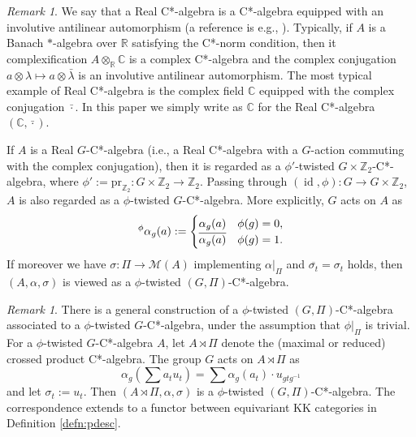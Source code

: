 \documentclass[11pt]{amsart}
\theoremstyle{definition}
\theoremstyle{plain}
\theoremstyle{remark}
\newtheorem{rmk}[equation]{Remark}
\DeclareMathOperator{\id}{id}
\newcommand{\bC}{\mathbb{C}}
\newcommand{\bR}{\mathbb{R}}
\newcommand{\bZ}{\mathbb{Z}}
\newcommand{\cM}{\mathcal{M}}
\newcommand{\pr}{\mathrm{pr}}
\begin{document}
\begin{rmk}\label{rmk:real}
We say that a Real C*-algebra is a C*-algebra equipped with an involutive antilinear automorphism (a reference is e.g., \cite{goodearlNotesRealComplex1982}). Typically, if $A$ is a Banach $\ast$-algebra over $\bR$ satisfying the C*-norm condition, then it complexification $A \otimes _\bR \bC$ is a complex C*-algebra and the complex conjugation $a \otimes \lambda \mapsto a \otimes \bar{\lambda}$ is an involutive antilinear automorphism. 
The most typical example of Real C*-algebra is the complex field $\bC$ equipped with the complex conjugation $\bar{\cdot}$. In this paper we simply write as $\bC$ for the Real C*-algebra $(\bC, \bar{\cdot})$.


If $A$ is a Real $G$-C*-algebra (i.e., a Real C*-algebra with a $G$-action commuting with the complex conjugation), then it is regarded as a $\phi'$-twisted $G \times \bZ_2$-C*-algebra, where $\phi':=\pr_{\bZ_2} \colon G \times \bZ_2 \to \bZ_2 $. Passing through $(\id , \phi) \colon G \to G \times \bZ_2$, $A$ is also regarded as a $\phi$-twisted $G$-C*-algebra. More explicitly, $G$ acts on $A$ as
\[\prescript{\phi}{} \alpha_g(a) := \begin{cases} \alpha_g(a) & \phi (g)=0, \\ \overline{\alpha_g(a)} & \phi(g) =1 .\end{cases}\]
If moreover we have $\sigma \colon \Pi \to \cM(A)$ implementing $\alpha|_\Pi$ and $\overline{\sigma_t}=\sigma_t$ holds, then $(A,\alpha, \sigma)$ is viewed as a $\phi$-twisted $(G,\Pi)$-C*-algebra. 
\end{rmk}

\begin{rmk}\label{rmk:cross}
There is a general construction of a $\phi$-twisted $(G,\Pi)$-C*-algebra associated to a $\phi$-twisted $G$-C*-algebra, under the assumption that $\phi|_\Pi$ is trivial. For a $\phi$-twisted $G$-C*-algebra $A$, let $A \rtimes \Pi$ denote the (maximal or reduced) crossed product C*-algebra. The group $G$ acts on $A \rtimes \Pi$ as 
\[ \alpha_g(\sum a_t u_t) = \sum \alpha_g(a_t) \cdot u_{gtg^{-1}} \]
and let $\sigma_t :=u_t$. Then $(A \rtimes \Pi, \alpha, \sigma)$ is a $\phi$-twisted $(G,\Pi)$-C*-algebra. The correspondence extends to a functor between equivariant KK categories in Definition \ref{defn:pdesc}.
\end{rmk}
\end{document}
